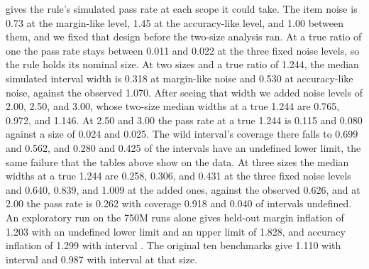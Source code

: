  gives the rule's simulated pass rate at each scope it could take. The item noise is 0.73 at the margin-like level, 1.45 at the accuracy-like level, and 1.00 between them, and we fixed that design before the two-size analysis ran. At a true ratio of one the pass rate stays between 0.011 and 0.022 at the three fixed noise levels, so the rule holds its nominal size. At two sizes and a true ratio of 1.244, the median simulated interval width is 0.318 at margin-like noise and 0.530 at accuracy-like noise, against the observed 1.070. After seeing that width we added noise levels of 2.00, 2.50, and 3.00, whose two-size median widths at a true 1.244 are 0.765, 0.972, and 1.146. At 2.50 and 3.00 the pass rate at a true 1.244 is 0.115 and 0.080 against a size of 0.024 and 0.025. The wild interval's coverage there falls to 0.699 and 0.562, and 0.280 and 0.425 of the intervals have an undefined lower limit, the same failure that the tables above show on the data. At three sizes the median widths at a true 1.244 are 0.258, 0.306, and 0.431 at the three fixed noise levels and 0.640, 0.839, and 1.009 at the added ones, against the observed 0.626, and at 2.00 the pass rate is 0.262 with coverage 0.918 and 0.040 of intervals undefined. An exploratory run on the 750M runs alone gives held-out margin inflation of 1.203 with an undefined lower limit and an upper limit of 1.828, and accuracy inflation of 1.299 with interval . The original ten benchmarks give 1.110 with interval  and 0.987 with interval  at that size.

